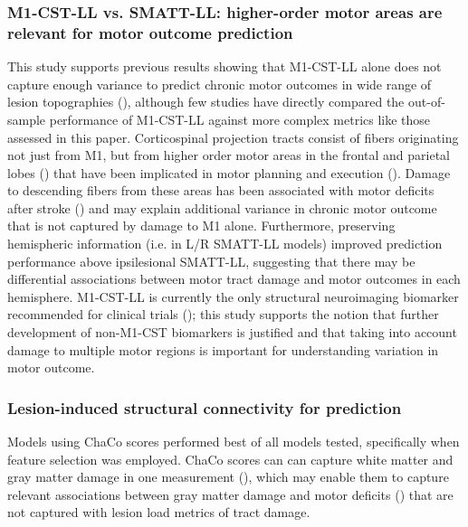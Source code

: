 \documentclass[phd,tocprelim]{cornell}
\begin{document}
\subsubsection{M1-CST-LL vs. SMATT-LL: higher-order motor areas are relevant for motor outcome prediction}
This study supports previous results showing that M1-CST-LL alone does not capture enough variance to predict chronic motor outcomes in wide range of lesion topographies (\cite{Rondina2017-ij, Park2016-te, Ito2022-em}), although few studies have directly compared the out-of-sample performance of M1-CST-LL against more complex metrics like those assessed in this paper. Corticospinal projection tracts consist of fibers originating not just from M1, but from higher order motor areas in the frontal and parietal lobes (\cite{Galea1994-yi}) that have been implicated in motor planning and execution (\cite{Ball1999-yo}). Damage to descending fibers from these areas has been associated with motor deficits after stroke (\cite{Ito2022-em, Riley2011-xo}) and may explain additional variance in chronic motor outcome that is not captured by damage to M1 alone. Furthermore, preserving hemispheric information (i.e. in L/R SMATT-LL models) improved prediction performance above ipsilesional SMATT-LL, suggesting that there may be differential associations between motor tract damage and motor outcomes in each hemisphere. M1-CST-LL is currently the only structural neuroimaging biomarker recommended for clinical trials (\cite{Boyd2017-gs}); this study supports the notion that further development of non-M1-CST biomarkers is justified and that taking into account damage to multiple motor regions is important for understanding variation in motor outcome.

\subsubsection{Lesion-induced structural connectivity for prediction}

Models using ChaCo scores performed best of all models tested, specifically when feature selection was employed. ChaCo scores can can capture white matter and gray matter damage in one measurement (\cite{Kuceyeski2013-nk}), which may enable them to capture relevant associations between gray matter damage and motor deficits (\cite{Park2016-te,Rondina2016-ds}) that are not captured with lesion load metrics of tract damage. 
\end{document}
